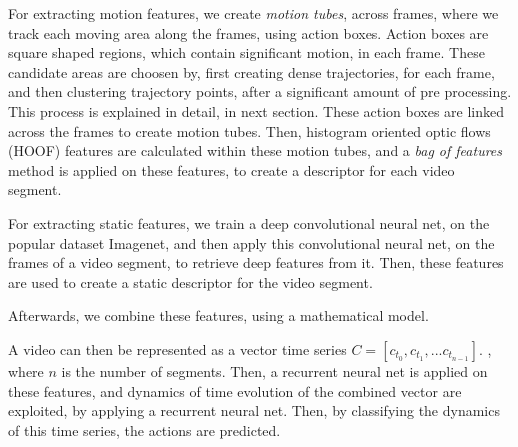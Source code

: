 For extracting motion features, we create \textit{motion tubes}, across frames, where we track each moving area along the frames, using action boxes.
Action boxes are square shaped regions, which contain significant motion, in each frame. These candidate areas are choosen by, first creating dense trajectories, for each frame,
and then clustering trajectory points, after a significant amount of pre processing. This process is explained in detail, in next section. 
These action boxes are linked across the frames to create motion tubes. Then, histogram oriented optic flows (HOOF) features are calculated within these motion tubes, and a 
\textit{bag of features}
method is applied on these features, to create a descriptor for each video segment. 

For extracting static features, we train a deep convolutional neural net, on the popular dataset Imagenet, and then apply this convolutional neural net,
on the frames of a video segment, to retrieve deep features from it. Then, these features are used
to create a static descriptor for the video segment.

Afterwards, we combine these features, using a mathematical model.

A video can then be represented as a vector time series $C = [c_{t_0}, c_{t_1}, ...c_{t_{n-1}}]$.
, where $n$ is the number of segments. Then, a recurrent neural net is applied on these features, and dynamics of time evolution of the combined vector are exploited,
by applying a recurrent neural net. Then, by classifying the dynamics of this time series, the actions are predicted.



